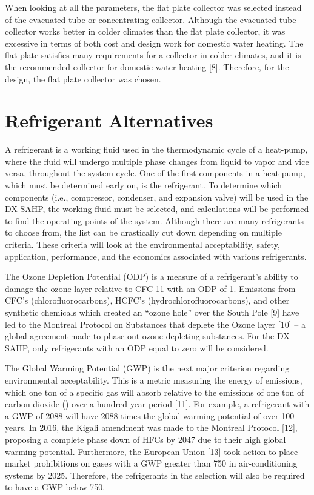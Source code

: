 \medskip
When looking at all the parameters, the flat plate collector was selected instead of the evacuated tube or concentrating collector. Although the evacuated tube collector works better in colder climates than the flat plate collector, it was excessive in terms of both cost and design work for domestic water heating. The flat plate satisfies many requirements for a collector in colder climates, and it is the recommended collector for domestic water heating [8]. Therefore, for the design, the flat plate collector was chosen.

\section{Refrigerant Alternatives}

A refrigerant is a working fluid used in the thermodynamic cycle of a heat-pump, where the fluid will undergo multiple phase changes from liquid to vapor and vice versa, throughout the system cycle. One of the first components in a heat pump, which must be determined early on, is the refrigerant. To determine which components (i.e., compressor, condenser, and expansion valve) will be used in the DX-SAHP, the working fluid must be selected, and calculations will be performed to find the operating points of the system. Although there are many refrigerants to choose from, the list can be drastically cut down depending on multiple criteria. These criteria will look at the environmental acceptability, safety, application, performance, and the economics associated with various refrigerants.

\medskip
The Ozone Depletion Potential (ODP) is a measure of a refrigerant’s ability to damage the ozone layer relative to CFC-11 with an ODP of 1. Emissions from CFC’s (chlorofluorocarbons), HCFC’s (hydrochlorofluorocarbons), and other synthetic chemicals which created an “ozone hole” over the South Pole [9] have led to the Montreal Protocol on Substances that deplete the Ozone layer [10] – a global agreement made to phase out ozone-depleting substances. For the DX-SAHP, only refrigerants with an ODP equal to zero will be considered.

\medskip
The Global Warming Potential (GWP) is the next major criterion regarding environmental acceptability. This is a metric measuring the energy of emissions, which one ton of a specific gas will absorb relative to the emissions of one ton of carbon dioxide () over a hundred-year period [11]. For example, a refrigerant with a GWP of 2088 will have 2088 times the global warming potential of  over 100 years. In 2016, the Kigali amendment was made to the Montreal Protocol [12], proposing a complete phase down of HFCs by 2047 due to their high global warming potential. Furthermore, the European Union [13] took action to place market prohibitions on gases with a GWP greater than 750 in air-conditioning systems by 2025. Therefore, the refrigerants in the selection will also be required to have a GWP below 750.

